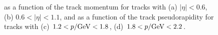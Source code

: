 \begin{figure}[htbp]
{}
\\
~
\caption{\epbg as a function of the track momentum for tracks with (a) $|\eta| < 0.6$, (b) $0.6 < |\eta| < 1.1$, and as a function of the track pseudorapidity for tracks with (c) $1.2 < p / \mathrm{Ge\kern -0.05em V} < 1.8$, (d) $1.8 < p / \mathrm{Ge\kern -0.05em V} < 2.2$.}
\label{fig:eoverp_background}
\end{figure}

